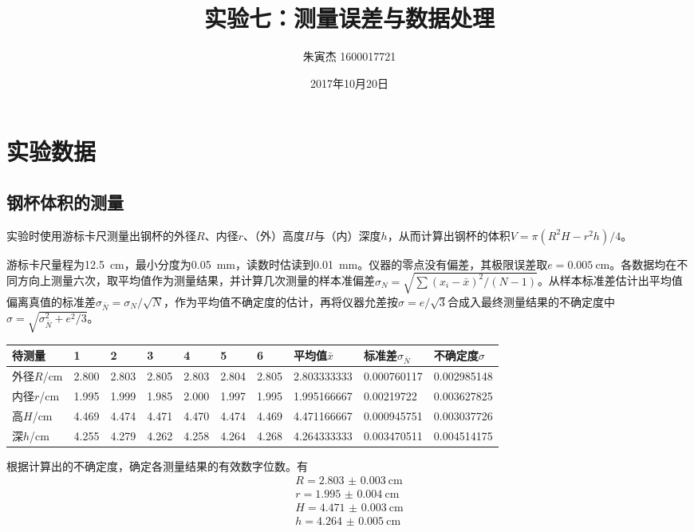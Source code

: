 \documentclass[UTF8]{ctexart}
\title{实验七：测量误差与数据处理}
\author{朱寅杰 1600017721}
\date{2017年10月20日}
\begin{document}
\maketitle

\section{实验数据}

\subsection{钢杯体积的测量}

实验时使用游标卡尺测量出钢杯的外径$R$、内径$r$、（外）高度$H$与（内）深度$h$，从而计算出钢杯的体积$V=\pi(R^2H-r^2h)/4$。

游标卡尺量程为\SI{12.5}{\cm}，最小分度为\SI{0.05}{\mm}，读数时估读到\SI{0.01}{\mm}。仪器的零点没有偏差，其极限误差取$e=\SI{0.005}{\cm}$。各数据均在不同方向上测量六次，取平均值作为测量结果，并计算几次测量的样本准偏差$\sigma_N=\sqrt{\sum (x_i-\bar{x})^2/(N-1)}$。从样本标准差估计出平均值偏离真值的标准差$\sigma_{\bar{N}}=\sigma_N/\sqrt{N}$，作为平均值不确定度的估计，再将仪器允差按$\sigma=e/\sqrt{3}$合成入最终测量结果的不确定度中$\sigma=\sqrt{\sigma_{\bar{N}}^2+e^2/3}$。

\noindent
\begin{tabu} to \linewidth {X[2]|X X X X X X|X[2] X[2]|X[2]}
\hline
待测量& 1&  2&  3&  4&  5&  6&  平均值$\bar{x}$&标准差$\sigma_{\bar{N}}$&不确定度$\sigma$ \\
\hline
外径$R$/cm&	2.800&	2.803&	2.805&	2.803&	2.804&	2.805&	2.803333333&	0.000760117&	0.002985148
\\
内径$r$/cm&	1.995&	1.999&	1.985&	2.000&	1.997&	1.995&	1.995166667&	0.00219722&	0.003627825
\\
高$H$/cm&	4.469&	4.474&	4.471&	4.470&	4.474&	4.469&	4.471166667&	0.000945751&	0.003037726
\\
深$h$/cm&	4.255&	4.279&	4.262&	4.258&	4.264&	4.268&	4.264333333&	0.003470511&	0.004514175
\\
\hline
\end{tabu}

根据计算出的不确定度，确定各测量结果的有效数字位数。有
\begin{gather}
   R=\SI{2.803(3)}{\cm} \\
   r=\SI{1.995(4)}{\cm} \\
   H=\SI{4.471(3)}{\cm} \\
   h=\SI{4.264(5)}{\cm}
\end{gather}
\end{document}
